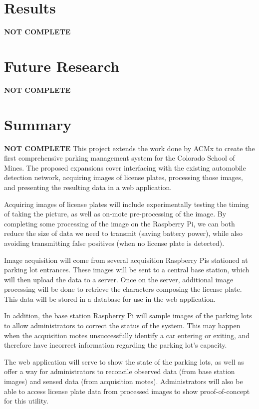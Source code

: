 \documentclass[11pt, oneside, fullpage, doublespace]{article}
\begin{document}
\section{Results}
{\color{red}\textbf{NOT COMPLETE}}


\section{Future Research}
{\color{red}\textbf{NOT COMPLETE}}

\section{Summary}
{\color{red}\textbf{NOT COMPLETE}}
This project extends the work done by ACMx to create the first comprehensive parking management system for the Colorado School of Mines. The proposed expansions cover interfacing with the existing automobile detection network, acquiring images of license plates, processing those images, and presenting the resulting data in a web application.

Acquiring images of license plates will include experimentally testing the timing of taking the picture, as well as on-mote pre-processing of the image. By completing some processing of the image on the Raspberry Pi, we can both reduce the size of data we need to transmit (saving battery power), while also avoiding transmitting false positives (when no license plate is detected).

Image acquisition will come from several acquisition Raspberry Pis stationed at parking lot entrances. These images will be sent to a central base station, which will then upload the data to a server. Once on the server, additional image processing will be done to retrieve the characters composing the license plate. This data will be stored in a database for use in the web application.

In addition, the base station Raspberry Pi will sample images of the parking lots to allow administrators to correct the status of the system. This may happen when the acquisition motes unsuccessfully identify a car entering or exiting, and therefore have incorrect information regarding the parking lot's capacity.

The web application will serve to show the state of the parking lots, as well as offer a way for administrators to reconcile observed data (from base station images) and sensed data (from acquisition motes). Administrators will also be able to access license plate data from processed images to show proof-of-concept for this utility.
\end{document}
